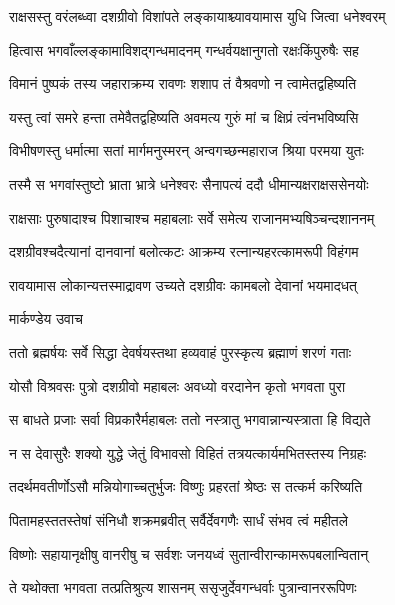 

\twolineshloka
{राक्षसस्तु वरंलब्ध्वा दशग्रीवो विशांपते}
{लङ्कायाश्च्यावयामास युधि जित्वा धनेश्वरम्}


\twolineshloka
{हित्वास भगवाँल्लङ्कामाविशद्गन्धमादनम्}
{गन्धर्वयक्षानुगतो रक्षःकिंपुरुषैः सह}


\twolineshloka
{विमानं पुष्पकं तस्य जहाराक्रम्य रावणः}
{शशाप तं वैश्रवणो न त्वामेतद्वहिष्यति}


\twolineshloka
{यस्तु त्वां समरे हन्ता तमेवैतद्वहिष्यति}
{अवमत्य गुरुं मां च क्षिप्रं त्वंनभविष्यसि}


\twolineshloka
{विभीषणस्तु धर्मात्मा सतां मार्गमनुस्मरन्}
{अन्वगच्छन्महाराज श्रिया परमया युतः}


\twolineshloka
{तस्मै स भगवांस्तुष्टो भ्राता भ्रात्रे धनेश्वरः}
{सैनापत्यं ददौ धीमान्यक्षराक्षससेनयोः}


\twolineshloka
{राक्षसाः पुरुषादाश्च पिशाचाश्च महाबलाः}
{सर्वे समेत्य राजानमभ्यषिञ्चन्दशाननम्}


\twolineshloka
{दशग्रीवश्चदैत्यानां दानवानां बलोत्कटः}
{आक्रम्य रत्नान्यहरत्कामरूपी विहंगम}


\twolineshloka
{रावयामास लोकान्यत्तस्माद्रावण उच्यते}
{दशग्रीवः कामबलो देवानां भयमादधत्}


\twolineshloka
{मार्कण्डेय उवाच}
{}


\twolineshloka
{ततो ब्रह्मर्षयः सर्वे सिद्धा देवर्षयस्तथा}
{हव्यवाहं पुरस्कृत्य ब्रह्माणं शरणं गताः}



\twolineshloka
{योसौ विश्रवसः पुत्रो दशग्रीवो महाबलः}
{अवध्यो वरदानेन कृतो भगवता पुरा}


\twolineshloka
{स बाधते प्रजाः सर्वा विप्रकारैर्महाबलः}
{ततो नस्त्रातु भगवान्नान्यस्त्राता हि विद्यते}



\twolineshloka
{न स देवासुरैः शक्यो युद्धे जेतुं विभावसो}
{विहितं तत्रयत्कार्यमभितस्तस्य निग्रहः}


\twolineshloka
{तदर्थमवतीर्णोऽसौ मन्नियोगाच्चतुर्भुजः}
{विष्णुः प्रहरतां श्रेष्ठः स तत्कर्म करिष्यति}



\twolineshloka
{पितामहस्ततस्तेषां संनिधौ शक्रमब्रवीत्}
{सर्वैर्देवगणैः सार्धं संभव त्वं महीतले}


\twolineshloka
{विष्णोः सहायानृक्षीषु वानरीषु च सर्वशः}
{जनयध्वं सुतान्वीरान्कामरूपबलान्वितान्}


\twolineshloka
{ते यथोक्ता भगवता तत्प्रतिश्रुत्य शासनम्}
{ससृजुर्देवगन्धर्वाः पुत्रान्वानररूपिणः}


